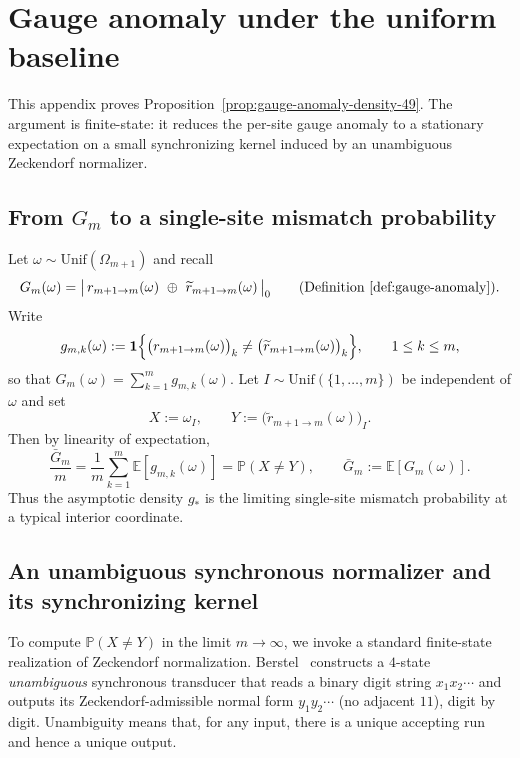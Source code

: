 \section{Gauge anomaly under the uniform baseline}\label{app:gauge-anomaly-transducer}

This appendix proves Proposition~\ref{prop:gauge-anomaly-density-49}.
The argument is finite-state: it reduces the per-site gauge anomaly to a stationary expectation on a small synchronizing kernel induced by an unambiguous Zeckendorf normalizer.

\subsection{From $G_m$ to a single-site mismatch probability}\label{app:gauge-anomaly-single-site}
Let $\omega\sim\mathrm{Unif}(\Omega_{m+1})$ and recall
\[
G_m(\omega)=\bigl|\,r_{m+1\to m}(\omega)\ \oplus\ \widetilde r_{m+1\to m}(\omega)\,\bigr|_0
\qquad\text{(Definition~\ref{def:gauge-anomaly}).}
\]
Write
\[
g_{m,k}(\omega):=\mathbf 1\Bigl\{\bigl(r_{m+1\to m}(\omega)\bigr)_k\neq \bigl(\widetilde r_{m+1\to m}(\omega)\bigr)_k\Bigr\},
\qquad 1\le k\le m,
\]
so that $G_m(\omega)=\sum_{k=1}^{m} g_{m,k}(\omega)$.
Let $I\sim\mathrm{Unif}(\{1,\dots,m\})$ be independent of $\omega$ and set
\[
X:=\omega_I,\qquad Y:=\bigl(\widetilde r_{m+1\to m}(\omega)\bigr)_I.
\]
Then by linearity of expectation,
\begin{equation}\label{eq:gauge-anomaly-density-single-site}
\frac{\bar G_m}{m}
=\frac{1}{m}\sum_{k=1}^{m}\mathbb E[g_{m,k}(\omega)]
=\mathbb P(X\neq Y),
\qquad \bar G_m:=\mathbb E[G_m(\omega)].
\end{equation}
Thus the asymptotic density $g_\ast$ is the limiting single-site mismatch probability at a typical interior coordinate.

\subsection{An unambiguous synchronous normalizer and its synchronizing kernel}\label{app:gauge-anomaly-kernel}
To compute $\mathbb P(X\neq Y)$ in the limit $m\to\infty$, we invoke a standard finite-state realization of Zeckendorf normalization.
Berstel~\cite{ITA_2001__35_6_491_0} constructs a $4$-state \emph{unambiguous} synchronous transducer that reads a binary digit string $x_1x_2\cdots$ and outputs its Zeckendorf-admissible normal form $y_1y_2\cdots$ (no adjacent $11$), digit by digit.
Unambiguity means that, for any input, there is a unique accepting run and hence a unique output.

